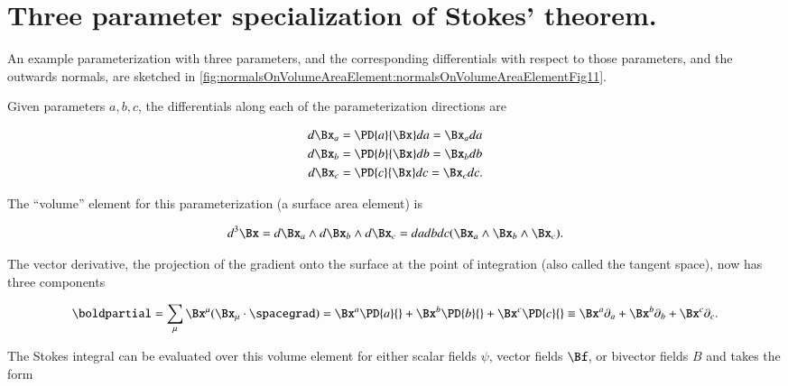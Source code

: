 \section{Three parameter specialization of Stokes' theorem.}

An example parameterization with three parameters, and the corresponding differentials with respect to those parameters, and the outwards normals, are sketched in
\cref{fig:normalsOnVolumeAreaElement:normalsOnVolumeAreaElementFig11}.


Given parameters \( a, b, c \), the differentials along each of the parameterization directions are

\begin{dmath}\label{eqn:stokesTheoremCore:1421}
\begin{aligned}
d\Bx_a &= \PD{a}{\Bx} da = \Bx_a da \\
d\Bx_b &= \PD{b}{\Bx} db = \Bx_b db \\
d\Bx_c &= \PD{c}{\Bx} dc = \Bx_c dc.
\end{aligned}
\end{dmath}

The ``volume'' element for this parameterization (a surface area element) is

\begin{equation}\label{eqn:stokesTheoremCore:1441}
d^3 \Bx
=
d\Bx_a
\wedge
d\Bx_b
\wedge
d\Bx_c
=
da db dc (\Bx_a \wedge \Bx_b \wedge \Bx_c).
\end{equation}

The vector derivative, the projection of the gradient onto the surface at the point of integration (also called the tangent space), now has three components

\begin{dmath}\label{eqn:stokesTheoremCore:1461}
\boldpartial
=
\sum_\mu \Bx^\mu (\Bx_\mu \cdot \spacegrad)
=
\Bx^a \PD{a}{}
+
\Bx^b \PD{b}{}
+
\Bx^c \PD{c}{}
\equiv
\Bx^a \partial_a
+
\Bx^b \partial_b
+
\Bx^c \partial_c.
\end{dmath}

The Stokes integral can be evaluated over this volume element for either scalar fields \( \psi \), vector fields \( \Bf \), or bivector fields \( B \) and takes the form

